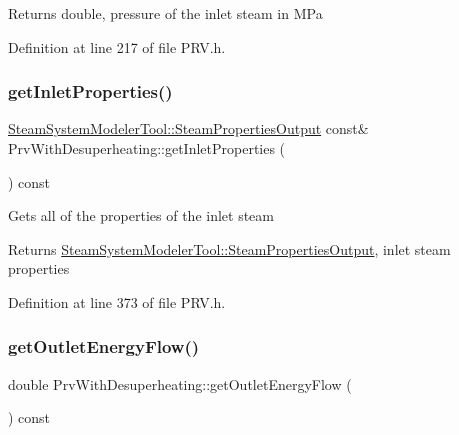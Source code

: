 \begin{DoxyReturn}{Returns}
double, pressure of the inlet steam in M\+Pa 
\end{DoxyReturn}


Definition at line 217 of file P\+R\+V.\+h.

\mbox{\label{class_prv_with_desuperheating_afc4f229df53ded72f07debdf17352a93}} 
\subsubsection{\texorpdfstring{get\+Inlet\+Properties()}{getInletProperties()}}
{\footnotesize\ttfamily \hyperlink{struct_steam_system_modeler_tool_1_1_steam_properties_output}{Steam\+System\+Modeler\+Tool\+::\+Steam\+Properties\+Output} const\& Prv\+With\+Desuperheating\+::get\+Inlet\+Properties (\begin{DoxyParamCaption}{ }\end{DoxyParamCaption}) const\hspace{0.3cm}{\ttfamily [inline]}}

Gets all of the properties of the inlet steam \begin{DoxyReturn}{Returns}
\hyperlink{struct_steam_system_modeler_tool_1_1_steam_properties_output}{Steam\+System\+Modeler\+Tool\+::\+Steam\+Properties\+Output}, inlet steam properties 
\end{DoxyReturn}


Definition at line 373 of file P\+R\+V.\+h.

\mbox{\label{class_prv_with_desuperheating_aa6e9bbb28c565ba8f7770f69ace33ab3}} 
\subsubsection{\texorpdfstring{get\+Outlet\+Energy\+Flow()}{getOutletEnergyFlow()}}
{\footnotesize\ttfamily double Prv\+With\+Desuperheating\+::get\+Outlet\+Energy\+Flow (\begin{DoxyParamCaption}{ }\end{DoxyParamCaption}) const\hspace{0.3cm}{\ttfamily [inline]}}

